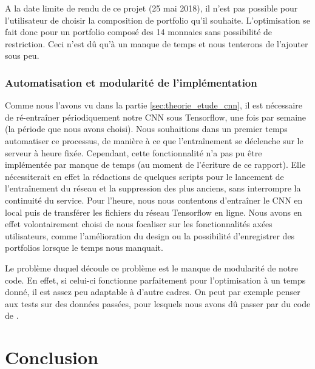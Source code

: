 \documentclass[a4paper, 10pt]{article}
\begin{document}
A la date limite de rendu de ce projet (25 mai 2018), il n'est pas possible pour l'utilisateur de choisir la composition de portfolio qu'il souhaite. L'optimisation se fait donc pour un portfolio composé des 14 monnaies sans possibilité de restriction. Ceci n'est dû qu'à un manque de temps et nous tenterons de l'ajouter sous peu.

\subsubsection{Automatisation et modularité de l'implémentation}
\label{sec:developpement_limites_auto}

Comme nous l'avons vu dans la partie \ref{sec:theorie_etude_cnn}, il est nécessaire de ré-entraîner périodiquement notre CNN sous Tensorflow, une fois par semaine (la période que nous avons choisi). Nous souhaitions dans un premier temps automatiser ce processus, de manière à ce que l'entraînement se déclenche sur le serveur à heure fixée. Cependant, cette fonctionnalité n'a pas pu être implémentée par manque de temps (au moment de l’écriture de ce rapport). Elle nécessiterait en effet la rédactions de quelques scripts pour le lancement de l'entraînement du réseau et la suppression des plus anciens, sans interrompre la continuité du service. Pour l'heure, nous nous contentons d'entraîner le CNN en local puis de transférer les fichiers du réseau Tensorflow en ligne. Nous avons en effet volontairement choisi de nous focaliser sur les fonctionnalités axées utilisateurs, comme l'amélioration du design ou la possibilité d'enregistrer des portfolios lorsque le temps nous manquait.

Le problème duquel découle ce problème est le manque de modularité de notre code. En effet, si celui-ci fonctionne parfaitement pour l'optimisation à un temps donné, il est assez peu adaptable à d'autre cadres. On peut par exemple penser aux tests sur des données passées, pour lesquels nous avons dû passer par du code de \citet{Jiang2017}.

\newpage
\section*{Conclusion}
\label{sec:conclu}
\end{document}
